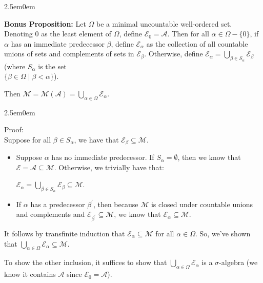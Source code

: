 \documentclass{book}
\newcommand{\hTwo}{%
\color{MidnightBlue}%
   \fontsize{13}{15}\selectfont%
}
\newcommand{\hThree}{%
   \color{PineGreen!85!Orange}
   \fontsize{12}{14}\selectfont%
}
\newcommand{\myComment}{%
   \color{RawerSienna}%
   \fontsize{12}{14}\selectfont%
}
\newenvironment{myIndent}{%
   \begin{adjustwidth}{2.5em}{0em}%
}{%
   \end{adjustwidth}%
}
\newcommand{\blab}[1]{\textbf{#1}}
\newcommand{\retTwo}{\hfill\bigbreak}
\begin{document}
\begin{myIndent}\hTwo
   \blab{Bonus Proposition:} Let $\Omega$ be a minimal uncountable well-ordered set. Denoting $0$ as the least element of $\Omega$, define $\mathcal{E}_0 = \mathcal{A}$. Then for all $\alpha \in \Omega - \{0\}$, if $\alpha$ has an immediate predecessor $\beta$, define $\mathcal{E}_\alpha$ as the collection of all countable unions of sets and complements of sets in $\mathcal{E}_\beta$. Otherwise, define $\mathcal{E}_\alpha = \bigcup\limits_{\beta \in S_\alpha} \mathcal{E}_\beta$ {\myComment(where $S_\alpha$ is the set\\ [-9pt] $\{\beta \in \Omega \mid \beta < \alpha\}$)}.\retTwo

   Then $\mathcal{M} = \mathcal{M}(\mathcal{A}) = \bigcup\limits_{\alpha \in \Omega}\mathcal{E}_\alpha$.
   
   \begin{myIndent}\hThree
      Proof:\\
      Suppose for all $\beta \in S_\alpha$, we have that $\mathcal{E}_\beta \subseteq \mathcal{M}$.
      \begin{itemize}
         \item Suppose $\alpha$ has no immediate predecessor. If $S_\alpha = \emptyset$, then we know that\\ $\mathcal{E} = \mathcal{A} \subseteq \mathcal{M}$. Otherwise, we trivially have that:
         
         {\centering $\mathcal{E}_\alpha = \bigcup\limits_{\beta \in S_\alpha}\mathcal{E}_\beta \subseteq \mathcal{M}$.\\ [0pt]\par}

         \item If $\alpha$ has a predecessor $\beta^\prime$, then because $\mathcal{M}$ is closed under countable unions and complements and $\mathcal{E}_{\beta^\prime} \subseteq \mathcal{M}$, we know that $\mathcal{E}_\alpha \subseteq \mathcal{M}$.\retTwo
      \end{itemize}

      It follows by transfinite induction that $\mathcal{E}_\alpha \subseteq \mathcal{M}$ for all $\alpha \in \Omega$. So, we've shown that $\bigcup\limits_{\alpha \in \Omega}\mathcal{E}_\alpha \subseteq \mathcal{M}$.\newpage

      To show the other inclusion, it suffices to show that $\bigcup\limits_{\alpha \in \Omega}\mathcal{E}_\alpha$ is a $\sigma$-algebra (we\\ [-6pt] know it contains $\mathcal{A}$ since $\mathcal{E}_0 = \mathcal{A}$).\retTwo


\end{myIndent}
\end{myIndent}
\end{document}
